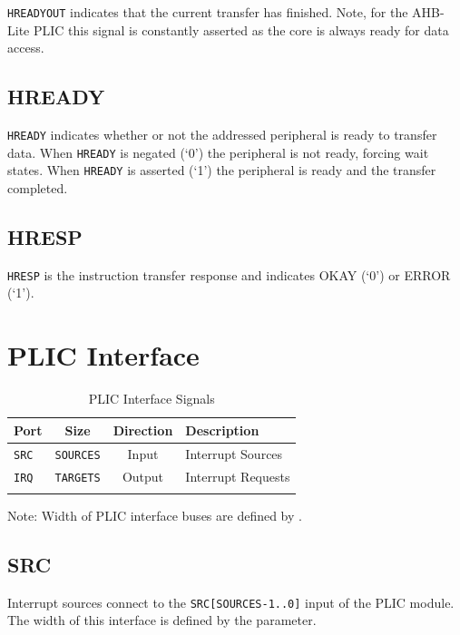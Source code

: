 \texttt{HREADYOUT} indicates that the current transfer has finished.
Note, for the AHB-Lite PLIC this signal is constantly asserted as the
core is always ready for data access.

\subsection{HREADY}

\texttt{HREADY} indicates whether or not the addressed peripheral is
ready to transfer data. When \texttt{HREADY} is negated (`0') the
peripheral is not ready, forcing wait states. When \texttt{HREADY} is
asserted (`1') the peripheral is ready and the transfer completed.

\subsection{HRESP}

\texttt{HRESP} is the instruction transfer response and indicates OKAY
(`0') or ERROR (`1').

\pagebreak

\section{PLIC Interface} 


\begin{longtable}[c]{@{\extracolsep{\fill}}lccl@{\extracolsep{\fill}}}	
	\toprule
	\textbf{Port} & \textbf{Size}    & \textbf{Direction} & \textbf{Description}\\
	\midrule 
	\endhead
	\texttt{SRC}  & \texttt{SOURCES} & Input  & Interrupt Sources\\
	\texttt{IRQ}  & \texttt{TARGETS} & Output & Interrupt Requests \\
	\bottomrule 	
	\caption{PLIC Interface Signals} 
	\label{tab:PLICIF2}

\end{longtable}


Note: Width of PLIC interface buses are defined by
. 

\subsection{SRC}

Interrupt sources connect to the \texttt{SRC{[}SOURCES-1..0{]}} input of
the PLIC module. The width of this interface is defined by the \texttt{} parameter. 

